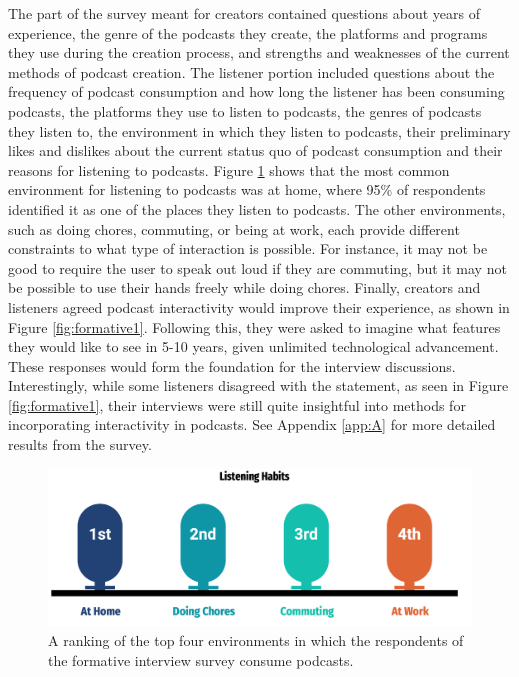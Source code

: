 \documentclass[12pt]{report}
\begin{document}
\begin{myfont}
        \indent The part of the survey meant for creators contained questions about years of experience, the genre of the podcasts they create, the platforms and programs they use during the creation process, and strengths and weaknesses of the current methods of podcast creation. The listener portion included questions about the frequency of podcast consumption and how long the listener has been consuming podcasts, the platforms they use to listen to podcasts, the genres of podcasts they listen to, the environment in which they listen to podcasts, their preliminary likes and dislikes about the current status quo of podcast consumption and their reasons for listening to podcasts. Figure \ref{fig:consumption} shows that the most common environment for listening to podcasts was at home, where 95\% of respondents identified it as one of the places they listen to podcasts. The other environments, such as doing chores, commuting, or being at work, each provide different constraints to what type of interaction is possible. For instance, it may not be good to require the user to speak out loud if they are commuting, but it may not be possible to use their hands freely while doing chores. Finally, creators and listeners agreed podcast interactivity would improve their experience, as shown in Figure \ref{fig:formative1}. Following this, they were asked to imagine what features they would like to see in 5-10 years, given unlimited technological advancement. These responses would form the foundation for the interview discussions. Interestingly, while some listeners disagreed with the statement, as seen in Figure \ref{fig:formative1}, their interviews were still quite insightful into methods for incorporating interactivity in podcasts. See Appendix \ref{app:A} for more detailed results from the survey.
        
        \begin{figure}[H]
        \centering
          \includegraphics[width=1\textwidth]{figures/consumption_habits.png}
          \caption{A ranking of the top four environments in which the respondents of the formative interview survey consume podcasts.}
          \label{fig:consumption}
        \end{figure}


\end{myfont}
\end{document}
